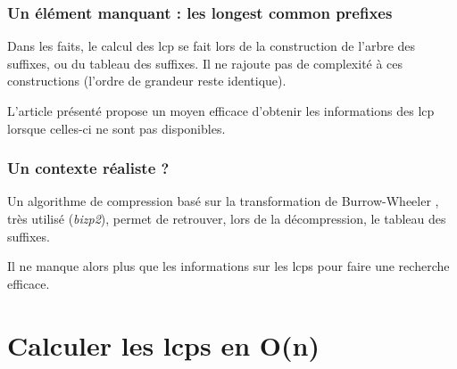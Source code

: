 \documentclass[10pt]{beamer}
\begin{document}
\begin{frame}
  \frametitle{Un élément manquant : les longest common prefixes}
  Dans les faits, le calcul des lcp se fait lors de la construction de
  l'arbre des suffixes, ou du tableau des suffixes. Il ne rajoute pas
  de complexité à ces constructions (l'ordre de grandeur reste
  identique).

  L'article présenté propose un moyen efficace d'obtenir
  les informations des lcp lorsque celles-ci ne sont pas
  disponibles\cite{Kasai01}.
\end{frame}


\begin{frame}
  \frametitle{Un contexte réaliste ?}
  Un algorithme de compression basé sur la transformation de
  Burrow-Wheeler \cite{Burrows94}, très utilisé (\emph{bizp2}), permet
  de retrouver, lors de la décompression, le tableau des suffixes. 

  Il ne manque alors plus que les informations sur les lcps pour faire
  une recherche efficace. 
\end{frame}

\section{Calculer les lcps en O(n)}
\label{sec:algo}

\end{document}
